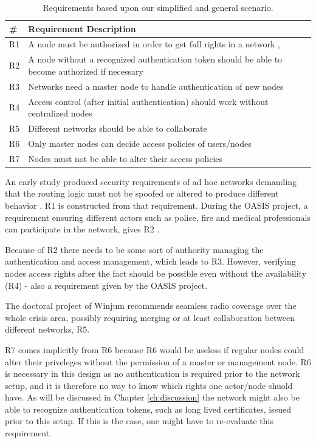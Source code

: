 \begin{table}[ht!]
	\centering
	\begin{tabular*}{\textwidth}{ | p{5mm} | p{388pt} | }
	\hline
	\textbf{\#} & \textbf{Requirement Description}\\\hline
		R1 & A node must be authorized in order to get full rights in a network \cite{dahill2001secure}, \cite{sanzgiri2002secure}\\\hline
		R2 & A node without a recognized authentication token should be able to become authorized if necessary\\\hline
		R3 & Networks need a master node to handle authentication of new nodes\\\hline
		R4 & Access control (after initial authentication) should work without centralized nodes\\\hline
		R5 & Different networks should be able to collaborate \cite{ffi_2005_04015}\\\hline
		R6 & Only master nodes can decide access policies of users/nodes\\\hline
		R7 & Nodes must not be able to alter their access policies\\\hline
	\end{tabular*}
	\caption{Requirements based upon our simplified and general scenario.}
	\label{tab:our_req}
\end{table}

An early study produced security requirements of ad hoc networks demanding
that the routing logic must not be spoofed or altered to produce different
behavior \cite{dahill2001secure}. R1 is constructed from that requirement.
During the OASIS project, a requirement ensuring different actors such as
police, fire and medical professionals can participate in the network, gives R2
\cite{5683058}.

Because of R2 there needs to be some sort of authority managing the
authentication and access management, which leads to R3. However, verifying
nodes access rights after the fact should be possible even without the
availability (R4) - also a requirement given by the OASIS project.

The doctoral project of Winjum recommends seamless radio coverage over the whole
crisis area, possibly requiring merging or at least collaboration between
different networks, R5.

R7 comes implicitly from R6 because R6 would be useless if regular nodes could
alter their priveleges without the permission of a master or management node. R6
is necessary in this design as no authentication is required prior to the
network setup, and it is therefore no way to know which rights one actor/node
shuold have. As will be discussed in Chapter \ref{ch:discussion} the network
might also be able to recognize authentication tokens, such as long lived
certificates, issued prior to this setup. If this is the case, one might have to
re-evaluate this requirement.

